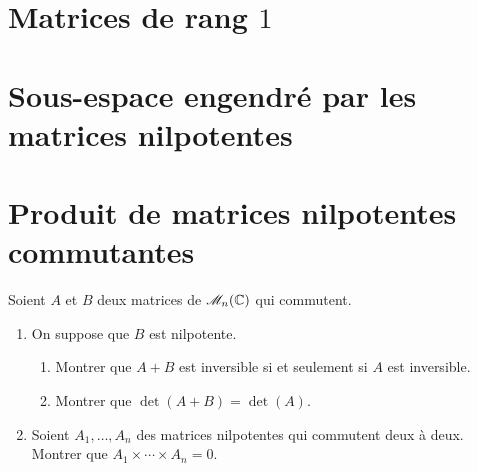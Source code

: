 \section{Matrices de rang \texorpdfstring{$1$}{1}}


\section{Sous-espace engendré par les matrices nilpotentes} 


\section{Produit de matrices nilpotentes commutantes} 
\begin{exercice}
    Soient $A$ et $B$ deux matrices de $\mathscr{M}_n(\mathbb{C})$ qui commutent. 
    \begin{enumerate}
        \item On suppose que $B$ est nilpotente. 
        \begin{enumerate}
            \item Montrer que $A + B$ est inversible si et seulement si $A$ est inversible.
            \item Montrer que $\det(A+B) = \det(A)$.
        \end{enumerate}
        \item Soient $A_1, \dots, A_n$ des matrices nilpotentes qui commutent deux à deux. Montrer que $A_1 \times \cdots \times A_n = 0$.
    \end{enumerate}
\end{exercice}

